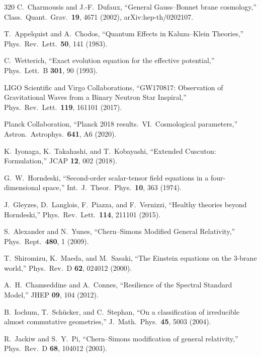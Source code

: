 \begin{thebibliography}{320}
C.~Charmousis and J.-F.~Dufaux,
``General Gauss--Bonnet brane cosmology,''
Class.\ Quant.\ Grav.\ \textbf{19}, 4671 (2002),
arXiv:hep-th/0202107.

T.~Appelquist and A.~Chodos,
``Quantum Effects in Kaluza--Klein Theories,''
Phys.\ Rev.\ Lett.\ \textbf{50}, 141 (1983).

C.~Wetterich,
``Exact evolution equation for the effective potential,''
Phys.\ Lett.\ B \textbf{301}, 90 (1993).

LIGO Scientific and Virgo Collaborations,
``GW170817: Observation of Gravitational Waves from a Binary Neutron Star Inspiral,''
Phys.\ Rev.\ Lett.\ \textbf{119}, 161101 (2017).

Planck Collaboration,
``Planck 2018 results.\ VI.\ Cosmological parameters,''
Astron.\ Astrophys.\ \textbf{641}, A6 (2020).

K.~Iyonaga, K.~Takahashi, and T.~Kobayashi,
``Extended Cuscuton: Formulation,''
JCAP \textbf{12}, 002 (2018).

G.~W.~Horndeski,
``Second-order scalar-tensor field equations in a four-dimensional space,''
Int.\ J.\ Theor.\ Phys.\ \textbf{10}, 363 (1974).

J.~Gleyzes, D.~Langlois, F.~Piazza, and F.~Vernizzi,
``Healthy theories beyond Horndeski,''
Phys.\ Rev.\ Lett.\ \textbf{114}, 211101 (2015).

S.~Alexander and N.~Yunes,
``Chern--Simons Modified General Relativity,''
Phys.\ Rept.\ \textbf{480}, 1 (2009).

T.~Shiromizu, K.~Maeda, and M.~Sasaki,
``The Einstein equations on the 3-brane world,''
Phys.\ Rev.\ D \textbf{62}, 024012 (2000).

A.~H.~Chamseddine and A.~Connes,
``Resilience of the Spectral Standard Model,''
JHEP \textbf{09}, 104 (2012).

B.~Iochum, T.~Sch\"ucker, and C.~Stephan,
``On a classification of irreducible almost commutative geometries,''
J.\ Math.\ Phys.\ \textbf{45}, 5003 (2004).

R.~Jackiw and S.~Y.~Pi,
``Chern--Simons modification of general relativity,''
Phys.\ Rev.\ D \textbf{68}, 104012 (2003).


\end{thebibliography}
